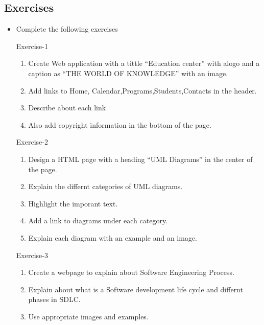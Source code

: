 \documentclass[11pt,a4paper]{article}
\begin{document}
\subsection*{Exercises}
\begin{itemize}
\item Complete the following  exercises

\item[Exercise-1]\
\begin{enumerate}[label=\bfseries Q\arabic*:]\itemsep10pt
\item Create Web application with a tittle ``Education center'' with alogo and a caption as ``THE WORLD OF KNOWLEDGE'' with an image.
\item Add links to Home, Calendar,Programs,Students,Contacts in the header.
\item Describe about each link
\item Also add copyright information in the bottom of the page.
\end{enumerate}

\item[Exercise-2]\
\begin{enumerate}[label=\bfseries Q\arabic*:]\itemsep10pt
\item Design a HTML page with a heading ``UML Diagrams'' in the center of the page.
\item Explain the differnt categories of UML diagrams.
\item Highlight the imporant text.
\item Add a link to diagrams under each category.
\item Explain each diagram with an example and an image.
\end{enumerate}

\item[Exercise-3]\
\begin{enumerate}[label=\bfseries Q\arabic*:]\itemsep10pt
\item Create a webpage to explain about Software Engineering Process.
\item Explain about what is a Software development life cycle and differnt phases in SDLC.
\item Use appropriate images and examples.
\end{enumerate}

\end{itemize}
\end{document}

